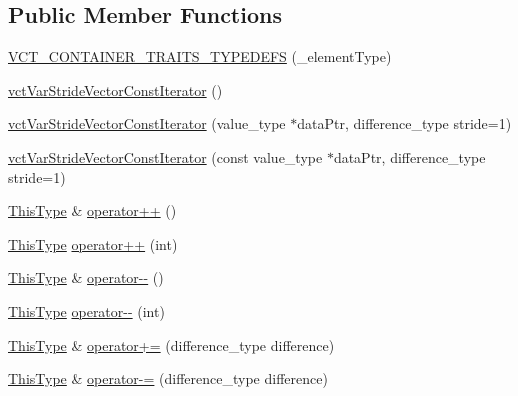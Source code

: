 \subsection*{Public Member Functions}
\begin{DoxyCompactItemize}
\item 
\hyperlink{classvct_var_stride_vector_const_iterator_a54d5bb180f198cc55568194d1ce4129c}{V\-C\-T\-\_\-\-C\-O\-N\-T\-A\-I\-N\-E\-R\-\_\-\-T\-R\-A\-I\-T\-S\-\_\-\-T\-Y\-P\-E\-D\-E\-F\-S} (\-\_\-element\-Type)
\item 
\hyperlink{classvct_var_stride_vector_const_iterator_af97b14def571ce0ee2b489d93a28e7b0}{vct\-Var\-Stride\-Vector\-Const\-Iterator} ()
\item 
\hyperlink{classvct_var_stride_vector_const_iterator_ae00e63fb9e2deae7fa6d949c4bec7652}{vct\-Var\-Stride\-Vector\-Const\-Iterator} (value\-\_\-type $\ast$data\-Ptr, difference\-\_\-type stride=1)
\item 
\hyperlink{classvct_var_stride_vector_const_iterator_a7f1e8affa1a308a17782d6609c95f02b}{vct\-Var\-Stride\-Vector\-Const\-Iterator} (const value\-\_\-type $\ast$data\-Ptr, difference\-\_\-type stride=1)
\item 
\hyperlink{classvct_var_stride_vector_const_iterator_afd99aad7dc756d227f4fb02cd569d00a}{This\-Type} \& \hyperlink{classvct_var_stride_vector_const_iterator_a8ebd4995ba7fe0b7f319a7a0f1cd52a0}{operator++} ()
\item 
\hyperlink{classvct_var_stride_vector_const_iterator_afd99aad7dc756d227f4fb02cd569d00a}{This\-Type} \hyperlink{classvct_var_stride_vector_const_iterator_a12591d59f1ef9294d4b52fdbca1de5fd}{operator++} (int)
\item 
\hyperlink{classvct_var_stride_vector_const_iterator_afd99aad7dc756d227f4fb02cd569d00a}{This\-Type} \& \hyperlink{classvct_var_stride_vector_const_iterator_a2fb864101547b86795e3468a2578d323}{operator-\/-\/} ()
\item 
\hyperlink{classvct_var_stride_vector_const_iterator_afd99aad7dc756d227f4fb02cd569d00a}{This\-Type} \hyperlink{classvct_var_stride_vector_const_iterator_a7d2d1fb4dda7dbff1aaa7b5e8f3ee4d1}{operator-\/-\/} (int)
\item 
\hyperlink{classvct_var_stride_vector_const_iterator_afd99aad7dc756d227f4fb02cd569d00a}{This\-Type} \& \hyperlink{classvct_var_stride_vector_const_iterator_a4343b9d61e4dfe8a9fc32dd47f00f83d}{operator+=} (difference\-\_\-type difference)
\item 
\hyperlink{classvct_var_stride_vector_const_iterator_afd99aad7dc756d227f4fb02cd569d00a}{This\-Type} \& \hyperlink{classvct_var_stride_vector_const_iterator_a0f344661bef0823c43074e75e744ef98}{operator-\/=} (difference\-\_\-type difference)

\end{DoxyCompactItemize}
